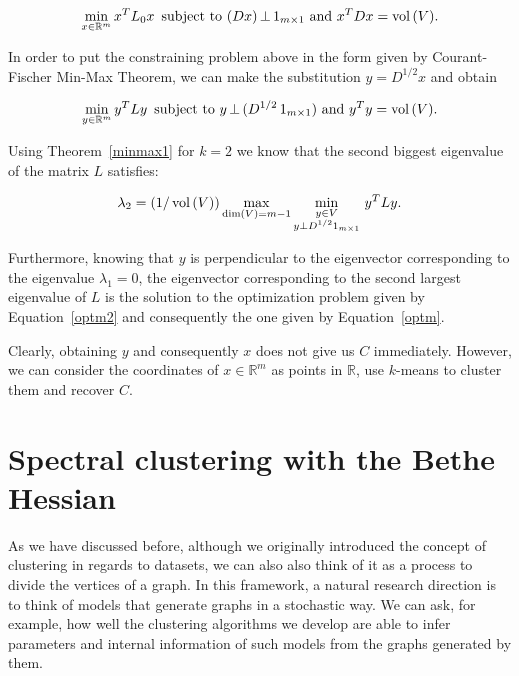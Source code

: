 \begin{equation}
   \min_{x \in \mathbb R^{m }} {x}^TL_0{x}\,\text{ subject to } (Dx)\, \bot \, 1_{m \times 1}  \text{ and } x^T D x = \operatorname*{vol\,} (V).
\end{equation}

In order to put the constraining problem above in the form given by Courant-Fischer Min-Max Theorem, we can make the substitution $y = D^{1/2}x$ and obtain

\begin{equation} \label{optm}
   \min_{y \in \mathbb R^{m }} y^TLy \,\text{ subject to } y \, \bot \, (D^{1/2} \,1_{m \times 1}) \text{ and } y^T y = \operatorname*{vol\,} (V).
\end{equation}

Using Theorem~\vref{minmax1} for $k = 2$ we know that the second biggest eigenvalue of the matrix $L$ satisfies:

\begin{equation}\label{optm2}
   \lambda_2 = \left( 1/\operatorname*{vol\,}(V) \right) \max_{\dim (V) = m-1} \min_{\substack{y \in V \\ y \bot D^{1/2}1_{m \times 1}}} \, y^TLy.
\end{equation}

Furthermore, knowing that $y$ is perpendicular to the eigenvector corresponding to the eigenvalue $\lambda_1 = 0$, the eigenvector corresponding to the second largest eigenvalue of $L$ is the solution to the optimization problem given by Equation~\ref{optm2} and consequently the one given by Equation~\ref{optm}.

Clearly, obtaining $y$ and consequently $x$ does not give us $C$ immediately.
However, we can consider the coordinates of $x \in \mathbb R^{m }$ as points in $\mathbb R$, use $k$-means to cluster them and recover $C$.

\chapter{Spectral clustering with the Bethe Hessian} \label{bethechapter}
As we have discussed before, although we originally introduced the concept of clustering in regards to datasets, we can also also think of it as a process to divide the vertices of a graph.
In this framework, a natural research direction is to think of models that generate graphs in a stochastic way. We can ask, for example, how well the clustering algorithms we develop are able to infer parameters and internal information of such models from the graphs generated by them.

